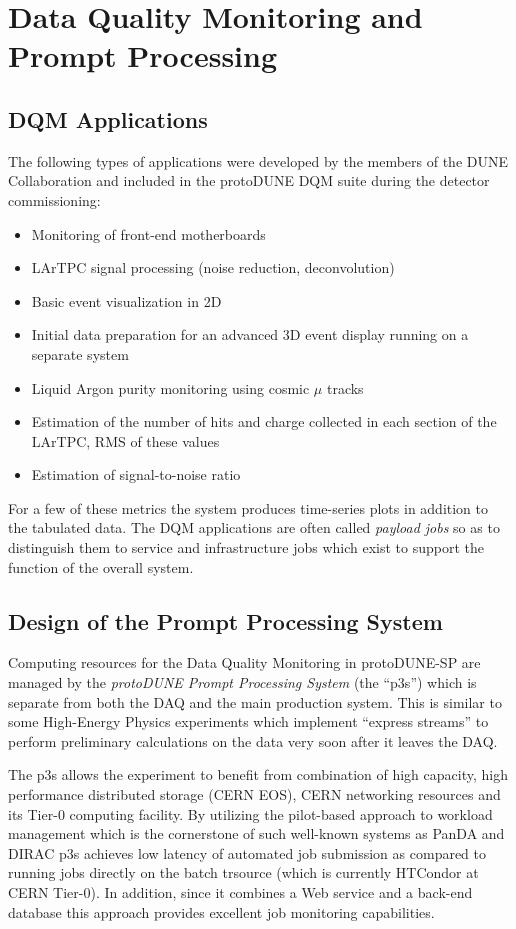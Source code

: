 \documentclass{webofc}
\newcommand{\pd}{protoDUNE\xspace}
\begin{document}
\section{Data Quality Monitoring and Prompt Processing}
\subsection{DQM Applications}
The following types of applications were developed by the members of the DUNE Collaboration and
included in the \pd DQM suite during the detector
commissioning:
\begin{itemize}
\item Monitoring of front-end motherboards
\item LArTPC signal processing (noise reduction, deconvolution)
\item Basic event visualization in 2D
\item Initial data preparation for an advanced 3D event display running on a separate system
\item Liquid Argon purity monitoring using cosmic $\mu$ tracks
\item Estimation of the number of hits and charge collected in each section of the LArTPC, RMS of these values
\item Estimation of signal-to-noise ratio
\end{itemize}

\noindent For a few of these metrics the system produces time-series plots in addition to the tabulated data.
The DQM applications are often called \textit{payload jobs} so as to distinguish
them to service and infrastructure jobs which exist to support the function of the overall system.


\subsection{Design of the Prompt Processing System}

Computing resources for the Data Quality Monitoring in \pd-SP are managed by
the  \textit{\pd Prompt Processing System} (the ``p3s'')
which is separate from both the DAQ and the main production system. This is similar to some High-Energy Physics
experiments which implement ``express streams'' to perform preliminary calculations on the data very soon
after it leaves the DAQ.

The  p3s allows the experiment to benefit from combination of high capacity, high
performance distributed storage (CERN EOS), CERN networking resources and its Tier-0 computing facility.
By utilizing the pilot-based approach \cite{eps} to workload management which is the cornerstone of such well-known
systems as PanDA and DIRAC \cite{panda,dirac} p3s achieves low latency of automated job submission
as compared to running jobs directly on the batch trsource (which is currently HTCondor at CERN Tier-0).
In addition, since it combines a Web service and a back-end database this approach provides excellent
job monitoring capabilities.
\end{document}
